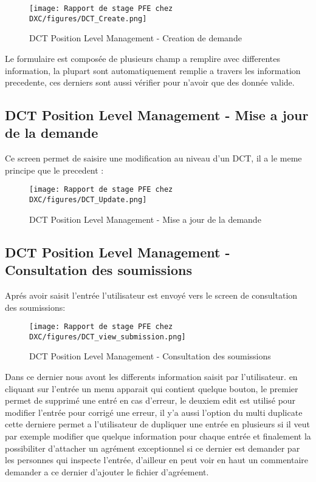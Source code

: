 \begin{figure}[H]
    \centering
    \texttt{[image: Rapport de stage PFE chez DXC/figures/DCT\_Create.png]}
    \caption{DCT Position Level Management - Creation de demande }
\end{figure}

Le formulaire est composée de plusieurs champ a remplire avec differentes information, la plupart sont automatiquement remplie a travers les information precedente, ces derniers sont aussi vérifier pour n'avoir que des donnée valide.

\subsection{DCT Position Level Management - Mise a jour de la demande}

Ce screen permet de saisire une modification au niveau d'un DCT, il a le meme principe que le precedent : 

\begin{figure}[H]
    \centering
    \texttt{[image: Rapport de stage PFE chez DXC/figures/DCT\_Update.png]}
    \caption{DCT Position Level Management - Mise a jour de la demande}
\end{figure}

\subsection{DCT Position Level Management - Consultation des soumissions}

Aprés avoir saisit l'entrée l'utilisateur est envoyé vers le screen de consultation des soumissions:


\begin{figure}[H]
    \centering
    \texttt{[image: Rapport de stage PFE chez DXC/figures/DCT\_view\_submission.png]}
    \caption{DCT Position Level Management - Consultation des soumissions}
\end{figure}

Dans ce dernier nous avont les differents information saisit par l'utilisateur. en cliquant sur l'entrée un menu apparait qui contient quelque bouton, le premier permet de supprimé une entré en cas d'erreur, le deuxiem edit est utilisé pour modifier l'entrée pour corrigé une erreur, il y'a aussi l'option du multi duplicate cette derniere permet a l'utilisateur de dupliquer une entrée en plusieurs si il veut par exemple modifier que quelque information pour chaque entrée et finalement la possibiliter d'attacher un agrément exceptionnel si ce dernier est demander par les personnes qui inspecte l'entrée, d'ailleur en peut voir en haut un commentaire demander a ce dernier d'ajouter le fichier d'agréement.

